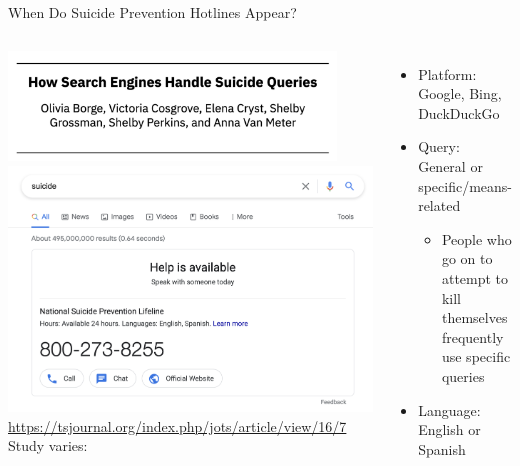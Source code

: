 \documentclass[nobackground,dvipsnames,table]{beamer}
\begin{document}
\begin{frame}{When Do Suicide Prevention Hotlines Appear?}
    \begin{columns}
            \centering
            \includegraphics[width=0.9\textwidth]{hsehsq-title}
            \includegraphics[width=\textwidth]{google-suicide-query-result}
            \tiny
            \url{https://tsjournal.org/index.php/jots/article/view/16/7}
            Study varies:
            \begin{itemize}
                \small
                \item Platform: Google, Bing, DuckDuckGo
                \item Query: General or specific/means-related
                \begin{itemize}
                    \footnotesize
                    \item People who go on to attempt to kill themselves frequently use specific queries
                \end{itemize}
                \item Language: English or Spanish
            \end{itemize}
    \end{columns}
\end{frame}
\end{document}
